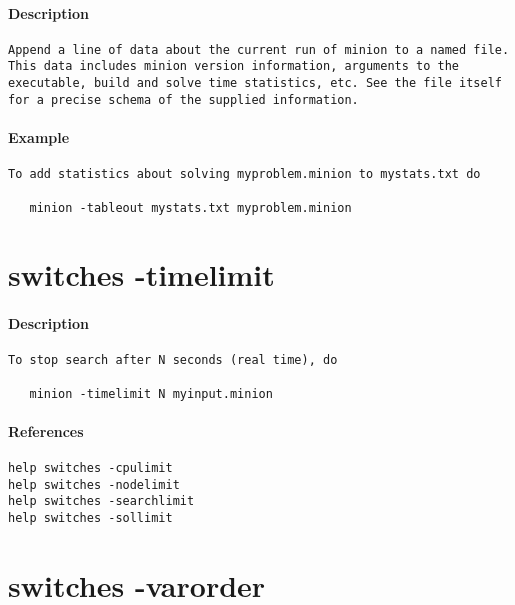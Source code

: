 \paragraph{Description}
{\footnotesize
\begin{verbatim}
Append a line of data about the current run of minion to a named file.
This data includes minion version information, arguments to the
executable, build and solve time statistics, etc. See the file itself
for a precise schema of the supplied information.
\end{verbatim}
}
\paragraph{Example}
{\footnotesize
\begin{verbatim}
To add statistics about solving myproblem.minion to mystats.txt do

   minion -tableout mystats.txt myproblem.minion
\end{verbatim}
}
\section{switches -timelimit}
\paragraph{Description}
{\footnotesize
\begin{verbatim}
To stop search after N seconds (real time), do

   minion -timelimit N myinput.minion
\end{verbatim}
}
\paragraph{References}
{\footnotesize
\begin{verbatim}
help switches -cpulimit
help switches -nodelimit
help switches -searchlimit
help switches -sollimit
\end{verbatim}
}
\section{switches -varorder}
